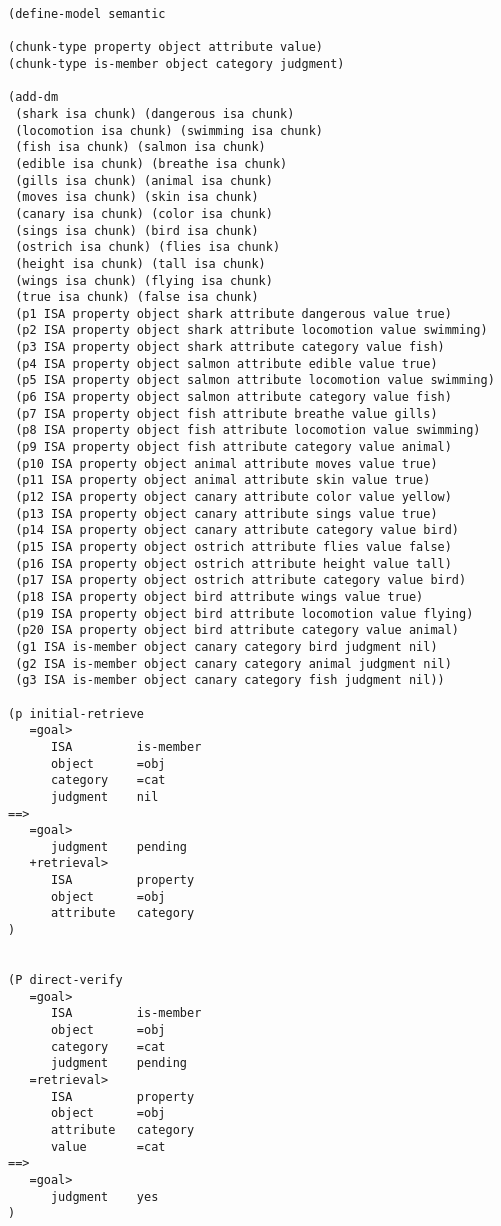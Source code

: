 \begin{lstlisting}[caption={ACT-R production rules for the semantic model}]
(define-model semantic

(chunk-type property object attribute value)
(chunk-type is-member object category judgment)

(add-dm
 (shark isa chunk) (dangerous isa chunk)
 (locomotion isa chunk) (swimming isa chunk) 
 (fish isa chunk) (salmon isa chunk)
 (edible isa chunk) (breathe isa chunk)
 (gills isa chunk) (animal isa chunk)
 (moves isa chunk) (skin isa chunk)
 (canary isa chunk) (color isa chunk)
 (sings isa chunk) (bird isa chunk) 
 (ostrich isa chunk) (flies isa chunk) 
 (height isa chunk) (tall isa chunk)
 (wings isa chunk) (flying isa chunk) 
 (true isa chunk) (false isa chunk) 
 (p1 ISA property object shark attribute dangerous value true)
 (p2 ISA property object shark attribute locomotion value swimming)
 (p3 ISA property object shark attribute category value fish)
 (p4 ISA property object salmon attribute edible value true)
 (p5 ISA property object salmon attribute locomotion value swimming)
 (p6 ISA property object salmon attribute category value fish)
 (p7 ISA property object fish attribute breathe value gills)
 (p8 ISA property object fish attribute locomotion value swimming)
 (p9 ISA property object fish attribute category value animal)
 (p10 ISA property object animal attribute moves value true)
 (p11 ISA property object animal attribute skin value true)
 (p12 ISA property object canary attribute color value yellow)
 (p13 ISA property object canary attribute sings value true)
 (p14 ISA property object canary attribute category value bird)
 (p15 ISA property object ostrich attribute flies value false)
 (p16 ISA property object ostrich attribute height value tall)
 (p17 ISA property object ostrich attribute category value bird)
 (p18 ISA property object bird attribute wings value true)
 (p19 ISA property object bird attribute locomotion value flying)
 (p20 ISA property object bird attribute category value animal)
 (g1 ISA is-member object canary category bird judgment nil)
 (g2 ISA is-member object canary category animal judgment nil)
 (g3 ISA is-member object canary category fish judgment nil))

(p initial-retrieve
   =goal>
      ISA         is-member
      object      =obj
      category    =cat
      judgment    nil
==>
   =goal>
      judgment    pending
   +retrieval>  
      ISA         property
      object      =obj
      attribute   category
)


(P direct-verify
   =goal>
      ISA         is-member
      object      =obj
      category    =cat
      judgment    pending
   =retrieval>
      ISA         property
      object      =obj
      attribute   category
      value       =cat
==>
   =goal>
      judgment    yes
)


\end{lstlisting}
